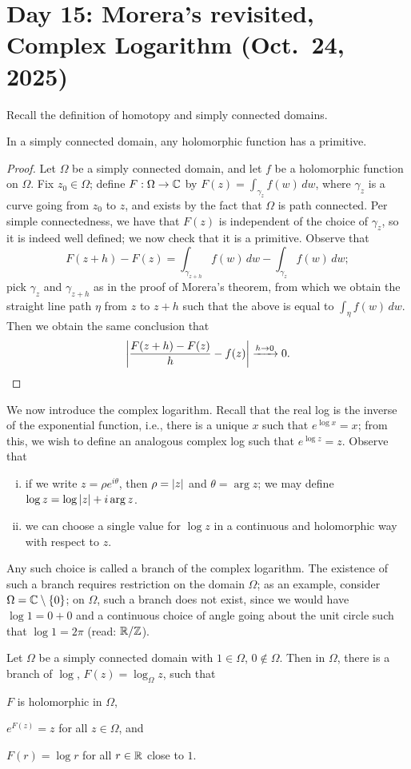 \section{Day 15: Morera's revisited, Complex Logarithm (Oct.\ 24, 2025)}
Recall the definition of homotopy and simply connected domains.
\begin{theorem}
    In a simply connected domain, any holomorphic function has a primitive.
\end{theorem}
\begin{proof}
    Let $\Omega$ be a simply connected domain, and let $f$ be a holomorphic function on $\Omega$. Fix $z_0 \in \Omega$; define $F : \Omega \to \mathbb C$ by $F(z) = \int_{\gamma_z} f(w) \, dw$, where $\gamma_z$ is a curve going from $z_0$ to $z$, and exists by the fact that $\Omega$ is path connected. Per simple connectedness, we have that $F(z)$ is independent of the choice of $\gamma_z$, so it is indeed well defined; we now check that it is a primitive. Observe that
    \[ F(z+h) - F(z) = \int_{\gamma_{z+h}} f(w) \, dw - \int_{\gamma_z} f(w) \, dw; \]
    pick $\gamma_z$ and $\gamma_{z+h}$ as in the proof of Morera's theorem, from which we obtain the straight line path $\eta$ from $z$ to $z + h$ such that the above is equal to $\int_{\eta} f(w) \, dw$. Then we obtain the same conclusion that
    \[ \left\lvert \frac{F(z+h) - F(z)}{h} - f(z) \right\rvert \xrightarrow{h \to 0} 0. \qedhere \]
\end{proof}
\noindent We now introduce the complex logarithm. Recall that the real log is the inverse of the exponential function, i.e., there is a unique $x$ such that $e^{\log x} = x$; from this, we wish to define an analogous complex log such that $e^{\log z} = z$. Observe that
\begin{enumerate}[(i)]
    \item if we write $z = \rho e^{i \theta}$, then $\rho = \left\lvert z \right\rvert$ and $\theta = \arg z$; we may define $\log z = \log \left\lvert z \right\rvert + i \arg z$.
    \item we can choose a single value for $\log z$ in a continuous and holomorphic way with respect to $z$.
\end{enumerate}
Any such choice is called a branch of the complex logarithm. The existence of such a branch requires restriction on the domain $\Omega$; as an example, consider $\Omega = \mathbb C \setminus \{0\}$; on $\Omega$, such a branch does not exist, since we would have $\log 1 = 0 + 0$ and a continuous choice of angle going about the unit circle such that $\log 1 = 2\pi$ (read: $\mathbb R/\mathbb Z$).
\begin{theorem}[\S 3.6.1]
    Let $\Omega$ be a simply connected domain with $1 \in \Omega$, $0 \not\in \Omega$. Then in $\Omega$, there is a branch of $\log$, $F(z) = \log_\Omega z$, such that \begin{parlist} \item $F$ is holomorphic in $\Omega$, \item $e^{F(z)} = z$ for all $z \in \Omega$, and \item $F(r) = \log r$ for all $r \in \mathbb R$ close to $1$. \end{parlist}
\end{theorem}
